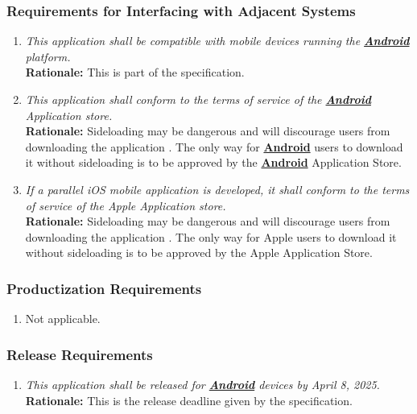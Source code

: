 \documentclass[]{article}
\begin{document}
\subsubsection{Requirements for Interfacing with Adjacent Systems}
\label{ssub:requirements_for_interfacing_with_adjacent_systems}
\begin{enumerate}[{OE-IA}1. ]
	\item \textit{This application shall be compatible with mobile devices running the \hyperref[Android]{\textbf{Android}} platform.} \\ \textbf{Rationale:} This is part of the specification.
    \item \textit{This application shall conform to the terms of service of the \hyperref[Android]{\textbf{Android}} Application store.} \\ \textbf{Rationale:} Sideloading may be dangerous and will discourage users from downloading the application \cite{Trio}. The only way for \hyperref[Android]{\textbf{Android}} users to download it without sideloading is to be approved by the \hyperref[Android]{\textbf{Android}} Application Store.
    \item \textit{If a parallel iOS mobile application is developed, it shall conform to the terms of service of the Apple Application store.} \\ \textbf{Rationale:} Sideloading may be dangerous and will discourage users from downloading the application \cite{Trio}. The only way for Apple users to download it without sideloading is to be approved by the Apple Application Store.
    
\end{enumerate}

\subsubsection{Productization Requirements}
\label{ssub:productization_requirements}
\begin{enumerate}[{OE-P}1. ]
	\item Not applicable.
\end{enumerate}

\subsubsection{Release Requirements}
\label{ssub:release_requirements}
\begin{enumerate}[{OE-R}1. ]
	\item \textit{This application shall be released for \hyperref[Android]{\textbf{Android}} devices by April 8, 2025.} \\ \textbf{Rationale:} This is the release deadline given by the specification.
\end{enumerate}
\end{document}
